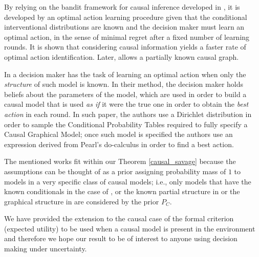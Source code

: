 \documentclass{article}
\theoremstyle{plain}
\begin{document}
By relying on the bandit framework for causal inference developed in \cite{bareinboim2015bandits}, it is developed by \cite{lattimoreNIPS2016} an optimal action learning procedure given that the conditional interventional distributions are known and the decision maker must learn an optimal action, in the sense of minimal regret after a fixed number of learning rounds. It is shown that considering causal information yields a faster rate of optimal action identification. Later, \cite{sen2017identifying} allows a partially known causal graph. 

In \cite{gonzalez2018playing} a decision maker has the task of learning an optimal action when only the \textit{structure} of such model is known. In their method, the decision maker holds beliefs about the parameters of the model, which are used in order to build a causal model that is used \textit{as if} it were the true one in order to obtain the \textit{best action} in each round. In such paper, the authors use a Dirichlet distribution in order to sample the Conditional Probability Tables required to fully specify a Causal Graphical Model; once such model is specified the authors use an expression derived from Pearl's do-calculus in order to find a best action. 

The mentioned works fit within our Theorem \ref{causal_savage} because the assumptions can be thought of as a prior assigning probability mass of $1$ to models in a very specific class of causal models; i.e., only models that have the known conditionals in the case of \cite{lattimoreNIPS2016}, or the known partial structure in \cite{sen2017identifying} or the graphical structure in \cite{gonzalez2018playing} are considered by the prior $P_C$.

We have provided the extension to the causal case of the formal criterion (expected utility) to be used when a causal model is present in the environment and therefore we hope our result to be of interest to anyone using decision making under uncertainty.
\end{document}
